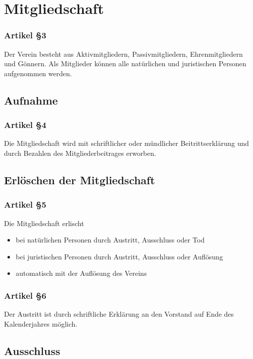\documentclass[a4paper,
               10pt,
               fleqn]{article}
\begin{document}
\section{Mitgliedschaft}

\subsubsection*{Artikel §3}
Der Verein besteht aus Aktivmitgliedern, Passivmitgliedern, 
Ehrenmitgliedern und Gönnern. Als Mitglieder können alle
natürlichen und juristischen Personen aufgenommen werden.

\subsection{Aufnahme}

\subsubsection*{Artikel §4}
Die Mitgliedschaft wird mit schriftlicher oder mündlicher 
Beitrittserklärung und durch Bezahlen des
Mitgliederbeitrages erworben.

\subsection{Erlöschen der Mitgliedschaft}

\subsubsection*{Artikel §5}
Die Mitgliedschaft erlischt
\begin{itemize}
\item bei natürlichen Personen durch Austritt, Ausschluss 
oder Tod
\item bei juristischen Personen durch Austritt, Ausschluss 
oder Auflösung
\item automatisch mit der Auflösung des Vereins
\end{itemize}

\subsubsection*{Artikel §6}
Der Austritt ist durch schriftliche Erklärung an den 
Vorstand auf Ende des Kalenderjahres möglich.

\subsection{Ausschluss}
\end{document}
